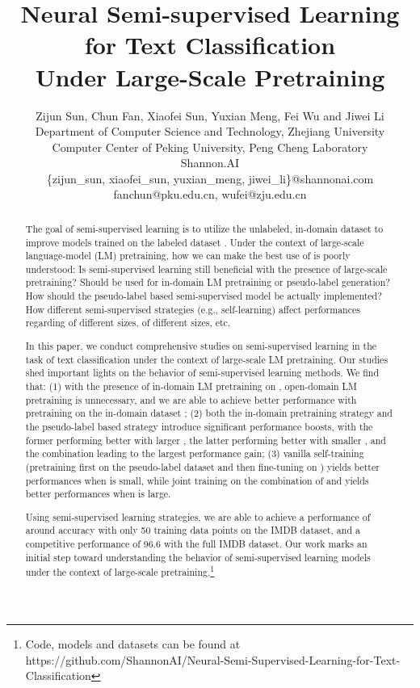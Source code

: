 \documentclass[11pt,a4paper]{article}
\title{Neural Semi-supervised Learning for Text Classification \\
Under Large-Scale  Pretraining 
}
\author{
Zijun Sun, Chun Fan, Xiaofei Sun, Yuxian Meng, Fei Wu and Jiwei Li\\
  Department of Computer Science and Technology, Zhejiang University\\
  Computer Center of Peking University, 
  Peng Cheng Laboratory\\
   Shannon.AI\\
  \{zijun\_sun, xiaofei\_sun, yuxian\_meng, jiwei\_li\}@shannonai.com\\
  fanchun@pku.edu.cn,
  wufei@zju.edu.cn
}
\date{}
\begin{document}
\maketitle

\begin{abstract}
The goal of semi-supervised learning is to utilize the unlabeled, in-domain dataset  to improve models trained on the labeled dataset .   
 Under the context of 
 large-scale language-model (LM) pretraining, 
 how we  can make the best use of
     is poorly understood: 
 Is semi-supervised learning still beneficial 
 with the presence of  large-scale pretraining?
 Should  be used for in-domain LM pretraining or pseudo-label generation?
How should the pseudo-label based semi-supervised model 
  be actually implemented?
How different semi-supervised strategies (e.g., self-learning) affect performances regarding  of different sizes,  of different sizes, etc. 

In this paper, we conduct comprehensive studies  on  semi-supervised learning in the 
task of text classification 
 under the context of 
large-scale
LM pretraining.
Our studies shed
important
 lights on the  behavior of semi-supervised learning methods. 
 We find that: 
(1)  with the presence of  in-domain LM pretraining  on , open-domain LM pretraining \cite{devlin2018bert} 
is unnecessary, and we
are able to achieve better performance with pretraining on  the in-domain dataset ;
(2) both the in-domain pretraining strategy and the pseudo-label based strategy introduce 
significant performance boosts, 
with the former performing better with larger ,  the latter performing better with smaller , and the combination leading to the largest performance gain; 
(3) vanilla self-training (pretraining first on the pseudo-label dataset  and then fine-tuning on ) yields better performances when  is small, while joint training on the combination of 
 and  yields better performances when  is large. 

Using semi-supervised learning strategies, we are able to achieve a performance of around  accuracy with only 50 training data points on the IMDB dataset, and 
 a competitive performance of 96.6 with the full  IMDB dataset. 
Our work marks an initial step toward understanding the behavior of semi-supervised learning models under the context of large-scale pretraining.\footnote{Code, models and datasets  can be found at https://github.com/ShannonAI/Neural-Semi-Supervised-Learning-for-Text-Classification}
\end{abstract}
\end{document}
